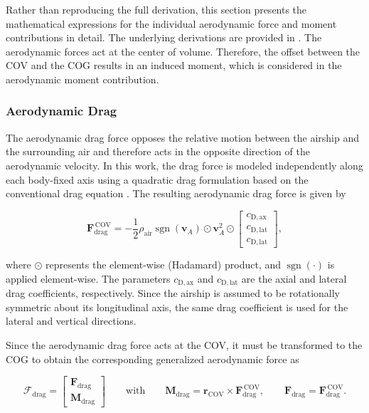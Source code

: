Rather than reproducing the full derivation, this section presents the mathematical expressions for the individual aerodynamic force and moment contributions in detail. The underlying derivations are provided in \cite{Li2007AirshipDynamics}.
The aerodynamic forces act at the center of volume. Therefore, the offset between the COV and the COG results in an induced moment, which is considered in the aerodynamic moment contribution.





\subsubsection{Aerodynamic Drag}
The aerodynamic drag force opposes the relative motion between the airship and the surrounding air and therefore acts in the opposite direction of the aerodynamic velocity. In this work, the drag force is modeled independently along each body-fixed axis using a quadratic drag formulation based on the conventional drag equation \cite{Anderson2017Fundamentals}. The resulting aerodynamic drag force is given by


\begin{equation}
	\bm{F}_\mathrm{drag}^\mathrm{\, COV}
	=
	-\frac{1}{2}\rho_\mathrm{air}
	\operatorname{sgn}(\bm{v}_A)
	\odot
	\bm{v}_A^2
	\odot
	\begin{bmatrix}
		c_\mathrm{D,ax} \\
		c_\mathrm{D,lat} \\
		c_\mathrm{D,lat}
	\end{bmatrix},
\end{equation}

where $\odot$ represents the element-wise (Hadamard) product, and $\operatorname{sgn}(\cdot)$ is applied element-wise. The parameters $c_\mathrm{D,ax}$ and $c_\mathrm{D,lat}$ are the axial and lateral drag coefficients, respectively. Since the airship is assumed to be rotationally symmetric about its longitudinal axis, the same drag coefficient is used for the lateral and vertical directions.

Since the aerodynamic drag force acts at the COV, it must be transformed to the COG to obtain the corresponding generalized aerodynamic force as

\begin{equation}
	\bm{\mathcal{F}}_\mathrm{drag}
	=
	\begin{bmatrix}
		\bm{F}_\mathrm{drag} \\ 	\bm{M}_\mathrm{drag}
	\end{bmatrix}
	\qquad
	\text{with}
	\qquad
	\bm{M}_\mathrm{drag}
	=
	\bm{r}_\mathrm{COV}
	\times
	\bm{F}_\mathrm{drag}^\mathrm{\, COV},
	\qquad
	\bm{F}_\mathrm{drag}
	=
	\bm{F}_\mathrm{drag}^{\mathrm{\, COV}}.
\end{equation}





